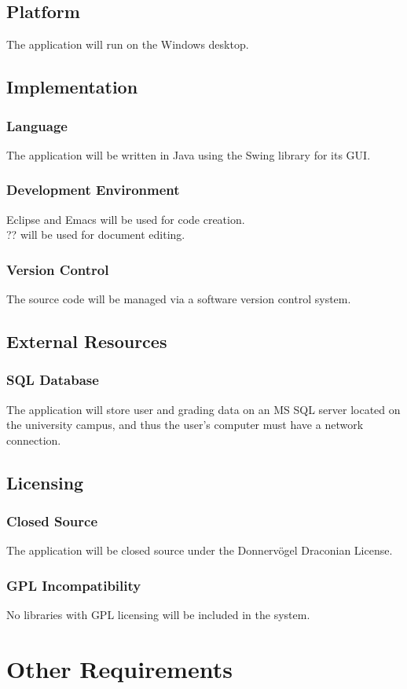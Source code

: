 \documentclass{article}
\begin{document}
\subsection{Platform}
The application will run on the Windows desktop.
\subsection{Implementation}
\subsubsection{Language}
The application will be written in Java using the Swing library for its GUI.
\subsubsection{Development Environment}
Eclipse and Emacs will be used for code creation.\\
?? will be used for document editing.
\subsubsection{Version Control}
The source code will be managed via a software version control system.
\subsection{External Resources}
\subsubsection{SQL Database}
The application will store user and grading data on an MS SQL server located on
the university campus, and thus the user's computer must have a network connection.
\subsection{Licensing}
\subsubsection{Closed Source}
The application will be closed source under the Donnervögel Draconian License.
\subsubsection{GPL Incompatibility}
No libraries with GPL licensing will be included in the system.

\section{Other Requirements}
\end{document}
